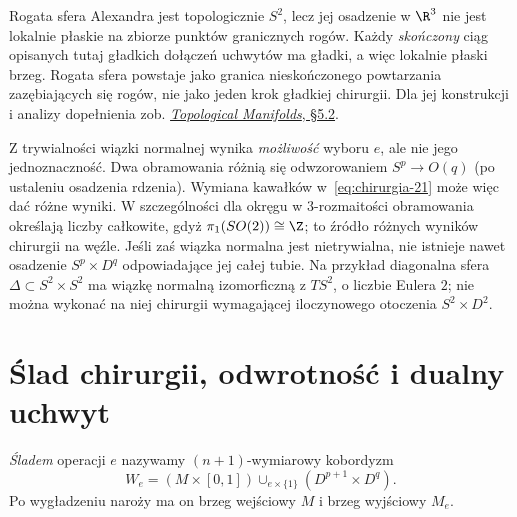 \begin{uwaga}
Rogata sfera Alexandra jest topologicznie
$S^2$, lecz jej osadzenie w $\R^3$ nie jest
lokalnie płaskie na zbiorze punktów granicznych
rogów. Każdy \emph{skończony} ciąg opisanych
tutaj gładkich dołączeń uchwytów ma gładki,
a więc lokalnie płaski brzeg. Rogata sfera
powstaje jako granica nieskończonego
powtarzania zazębiających się rogów, nie
jako jeden krok gładkiej chirurgii. Dla
jej konstrukcji i analizy dopełnienia zob.
\href{https://people.mpim-bonn.mpg.de/aruray/documents/top_manifolds.pdf}
{\emph{Topological Manifolds}, §5.2}.
\end{uwaga}

\begin{uwaga}
Z trywialności wiązki normalnej wynika \emph{możliwość}
wyboru $e$, ale nie jego jednoznaczność.
Dwa obramowania różnią się odwzorowaniem
$S^p\to O(q)$ (po ustaleniu osadzenia rdzenia).
Wymiana kawałków w~\eqref{eq:chirurgia-21} może więc
dać różne wyniki. W szczególności dla okręgu
w $3$-rozmaitości obramowania określają liczby
całkowite, gdyż $\pi_1(SO(2))\cong\Z$;
to źródło różnych wyników chirurgii na węźle.
Jeśli zaś wiązka normalna jest nietrywialna,
nie istnieje nawet osadzenie $S^p\times D^q$
odpowiadające jej całej tubie.
Na przykład diagonalna sfera $\Delta\subset S^2\times S^2$
ma wiązkę normalną izomorficzną z $TS^2$,
o liczbie Eulera $2$; nie można wykonać na niej
chirurgii wymagającej iloczynowego otoczenia
$S^2\times D^2$.
\end{uwaga}

\section{Ślad chirurgii, odwrotność i dualny uchwyt}
\label{sec:slad-chirurgii-21}

\begin{definicja}
\label{def:slad-chirurgii-21}
\emph{Śladem} operacji $e$ nazywamy $(n+1)$-wymiarowy
kobordyzm
\begin{equation}\label{eq:slad-chirurgii-21}
 W_e=(M\times[0,1])\cup_{e\times\{1\}}
        (D^{p+1}\times D^q).
\end{equation}
Po wygładzeniu naroży ma on brzeg wejściowy $M$
i brzeg wyjściowy $M_e$.
\end{definicja}

